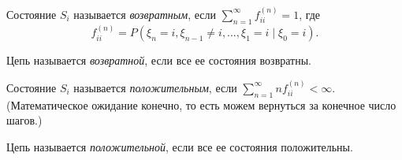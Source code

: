 \begin{definition}
  Состояние $S_i$ называется \emph{возвратным}, если $\sum\limits_{n=1}^{\infty} f_{ii}^{(n)} = 1$,
  где 
  \[
    f_{ii}^{(n)} = P(\xi_n = i, \xi_{n-1} \neq i, \dots, \xi_1 = i \mid \xi_0 = i).
  \]
\end{definition}

\begin{definition}
  Цепь называется \emph{возвратной}, если все ее состояния возвратны.
\end{definition}

\begin{definition}
  Состояние $S_i$ называется \emph{положительным}, если
  $\sum\limits_{n=1}^{\infty} n f_{ii}^{(n)} < \infty$.
  (Математическое ожидание конечно, то есть можем вернуться за конечное число шагов.)
\end{definition}

\begin{definition}
  Цепь называется \emph{положительной}, если все ее состояния положительны.
\end{definition}


